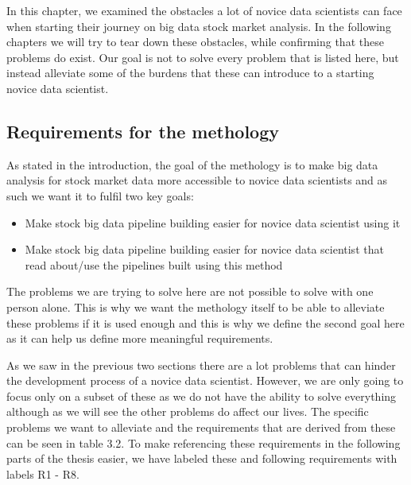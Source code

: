 In this chapter, we examined the obstacles a lot of novice data scientists can face when starting their journey on big data stock market analysis.
In the following chapters we will try to tear down these obstacles, while confirming that these problems do exist.
Our goal is not to solve every problem that is listed here, but instead alleviate some of the burdens that these can introduce to a starting novice data scientist.

\subsection{Requirements for the methology}

As stated in the introduction, the goal of the methology is to make big data analysis for stock market data more accessible to novice data scientists and as such we want it to fulfil two key goals:

\begin{itemize}
  \item Make stock big data pipeline building easier for novice data scientist using it
  \item Make stock big data pipeline building easier for novice data scientist that read about/use the pipelines built using this method
\end{itemize}

The problems we are trying to solve here are not possible to solve with one person alone.
This is why we want the methology itself to be able to alleviate these problems if it is used enough and this is why we define the second goal here as it can help us define more meaningful requirements.

As we saw in the previous two sections there are a lot problems that can hinder the development process of a novice data scientist.
However, we are only going to focus only on a subset of these as we do not have the ability to solve everything although as we will see the other problems do affect our lives.
The specific problems we want to alleviate and the requirements that are derived from these can be seen in table 3.2.
To make referencing these requirements in the following parts of the thesis easier, we have labeled these and following requirements with labels R1 - R8.


